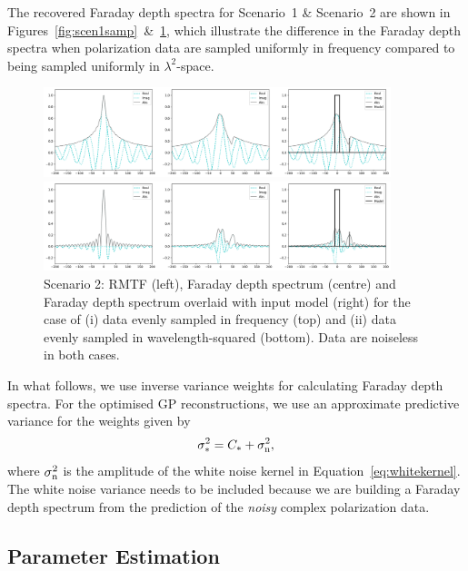 \documentclass[fleqn,usenatbib]{mnras}
\begin{document}
The recovered Faraday depth spectra for Scenario~1 \& Scenario~2 are shown in Figures~\ref{fig:scen1samp}~\&~\ref{fig:scen2samp}, which illustrate the difference in the Faraday depth spectra when polarization data are sampled uniformly in frequency compared to being sampled uniformly in $\lambda^2$-space.
%
\begin{figure}
\centerline{\includegraphics[width=0.9\textwidth]{./FIGURES/Scenario2_fsamp.png}}
\centerline{\includegraphics[width=0.9\textwidth]{./FIGURES/Scenario2_lsamp.png}}
\caption{\label{fig:scen2samp} Scenario 2: RMTF (left), Faraday depth spectrum (centre) and Faraday depth spectrum overlaid with input model (right) for the case of (i) data evenly sampled in frequency (top) and (ii) data evenly sampled in wavelength-squared (bottom). Data are noiseless in both cases.}
\end{figure}

In what follows, we use inverse variance weights for calculating Faraday depth spectra. For the optimised GP reconstructions, we use an approximate predictive variance for the weights given by
%
\begin{equation}
\label{eq:gpvar}
\sigma_{\ast}^2 = C_{\ast} + \sigma_{\rm n}^2,
\end{equation}
%
\citep{3569} where $\sigma_{\rm n}^2$ is the amplitude of the white noise kernel in Equation~\ref{eq:whitekernel}. The white noise variance needs to be included because we are building a Faraday depth spectrum from the prediction of the {\it noisy} complex polarization data.

\subsection{Parameter Estimation}
\label{sec:optimization}
\end{document}

